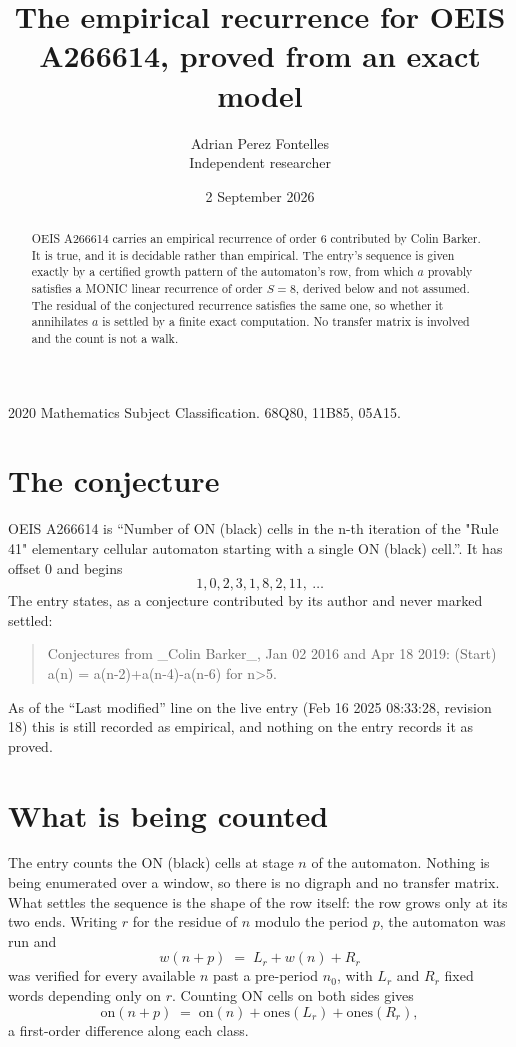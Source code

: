 \documentclass[11pt,a4paper]{article}
\title{The empirical recurrence for OEIS A266614, proved from an exact model}
\author{Adrian Perez Fontelles\\ \small Independent researcher}
\date{2 September 2026}
\theoremstyle{plain}
\theoremstyle{definition}
\begin{document}
\maketitle

\begin{abstract}
OEIS A266614 carries an empirical recurrence of order $6$ contributed by Colin Barker. It is true, and it is
decidable rather than empirical. The entry's sequence is given exactly by a certified growth pattern of the automaton's row, from
which $a$ provably satisfies a MONIC linear recurrence of order $S=8$, derived below and not
assumed. The residual of the conjectured recurrence satisfies the same one, so whether it
annihilates $a$ is settled by a finite exact computation. No transfer matrix is involved and
the count is not a walk.
\end{abstract}

\noindent\small 2020 Mathematics Subject Classification. 68Q80, 11B85, 05A15.\normalsize

\section{The conjecture}

OEIS A266614 is ``Number of ON (black) cells in the n-th iteration of the "Rule 41" elementary cellular automaton starting with a single ON (black) cell.''. It has offset $0$ and begins
\[
1, 0, 2, 3, 1, 8, 2, 11,\ \dots
\]
The entry states, as a conjecture contributed by its author and never marked settled:
\begin{quote}
Conjectures from \_Colin Barker\_, Jan 02 2016 and Apr 18 2019: (Start) a(n) = a(n-2)+a(n-4)-a(n-6) for n>5.
\end{quote}
As of the ``Last modified'' line on the live entry (Feb 16 2025 08:33:28, revision 18)
this is still recorded as empirical, and nothing on the entry records it as proved.

\section{What is being counted}

The entry counts the ON (black) cells at stage $n$ of the automaton. Nothing is being enumerated over a window, so there is
no digraph and no transfer matrix. What settles the sequence is the shape of the row itself:
the row grows only at its two ends. Writing
$r$ for the residue of $n$ modulo the period $p$, the automaton was run and
\[
w(n+p)\;=\;L_r + w(n) + R_r
\]
was verified for every available $n$ past a
pre-period $n_0$, with $L_r$ and $R_r$ fixed words depending only on $r$. Counting ON cells on
both sides gives
\[
\mathrm{on}(n+p)\;=\;\mathrm{on}(n)+\mathrm{ones}(L_r)+\mathrm{ones}(R_r),
\]
a first-order difference along each class.
\end{document}
